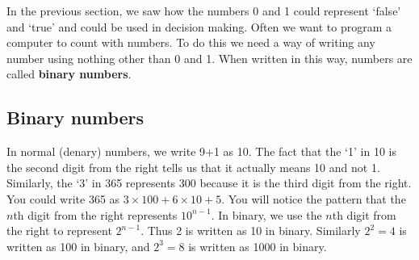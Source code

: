 
In the previous section, we saw how the numbers 0 and 1 could represent `false' and `true' and could be used in decision making.  Often we want to program a computer to count with numbers.  To do this we need a way of writing any number using nothing other than 0 and 1.  When written in this way, numbers are called {\bf binary numbers}.


\subsection{Binary numbers}

In normal (denary) numbers, we write 9+1 as 10.  The fact that the `1' in 10 is the second digit from the right tells us that it actually means 10 and not 1.  Similarly, the `3' in 365 represents 300 because it is the third digit from the right.  You could write 365 as $3 \times 100 + 6 \times 10 + 5$.  You will notice the pattern that the $n$th digit from the right represents $10^{n-1}$.  In binary, we use the $n$th digit from the right to represent $2^{n-1}$.  Thus 2 is written as 10 in binary.  Similarly $2^{2} = 4$ is written as 100 in binary, and $2^{3} = 8$ is written as 1000 in binary.

